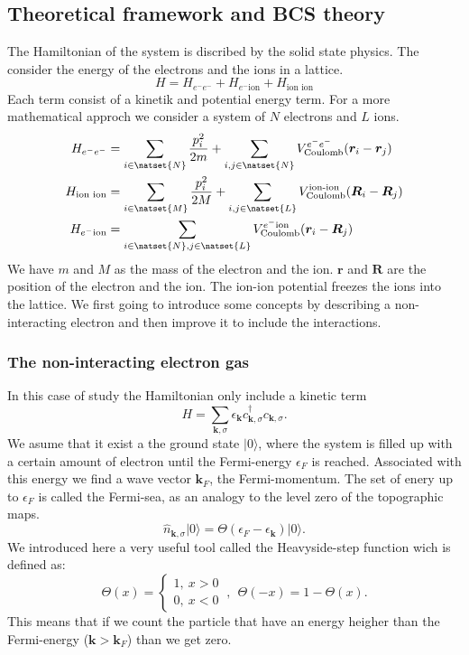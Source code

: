 \documentclass[../main.tex]{subfile}
\begin{document}
\subsection{Theoretical framework and BCS theory}
The Hamiltonian of the system is discribed by the solid state physics. The consider the energy of the electrons and the ions in a lattice.
\[
    H = H_{e^-e^-} + H_{e^-\text{ion}} + H_{\text{ion ion}}
\]
Each term consist of a kinetik and potential energy term. For a more mathematical approch we consider a system of $N$ electrons and $L$ ions.
\begin{align*}
    H_{e^-e^-} &= \sum_{i \in \natset{N}} \frac{p_i^2}{2m} + \sum_{i,j\in\natset{N}} V_{\text{Coulomb}}^{e^-e^-}(\bm{r}_i-\bm{r}_j) \\
    H_{\text{ion ion}} &=  \sum_{i \in \natset{M}} \frac{p_i^2}{2M} + \sum_{i,j\in\natset{L}} V_{\text{Coulomb}}^{\text{ion-ion}}(\bm{R}_i-\bm{R}_j) \\
    H_{e^-\text{ion}} &= \sum_{i\in \natset{N},j\in \natset{L}} V_{\text{Coulomb}}^{e^-\text{ion}}(\bm{r}_i-\bm{R}_j)
\end{align*}
We have $m$ and $M$ as the mass of the electron and the ion. $\bm{r}$ and $\bm{R}$ are the position of the electron and the ion. The ion-ion potential
freezes the ions into the lattice. 
We first going to introduce some concepts by describing a non-interacting electron and then improve it to include the interactions.

\subsubsection{The non-interacting electron gas}
In this case of study the Hamiltonian only include a kinetic term
\[
    H=\sum_{\bm{k},\sigma} \epsilon_{\bm{k}} c_{\bm{k},\sigma}^{\dagger}c_{\bm{k},\sigma}.
\] 
We asume that it exist a the ground state $|0\rangle$, where the system is filled up with a certain amount of electron until the Fermi-energy $\epsilon_F$ is reached. Associated with this
energy we find a wave vector $\bm{k}_F$, the Fermi-momentum. The set of enery up to $\epsilon_F$ is called the Fermi-sea, as an analogy to the level zero of the topographic maps.
\[
    \hat{n}_{\bm{k},\sigma} |0\rangle = \Theta(\epsilon_F - \epsilon_{\bm{k}})|0\rangle.
\]
We introduced here a very useful tool called the Heavyside-step function wich is defined as: 
\[
    \Theta(x) = \begin{cases}
        1, ~x > 0\\
        0, ~x < 0
    \end{cases} ~ , ~~ \Theta(-x) = 1 - \Theta(x).
\] 
This means that if we count the particle that have an energy heigher than the Fermi-energy ($\bm{k}>\bm{k}_F$) than we get zero.\\
\end{document}
